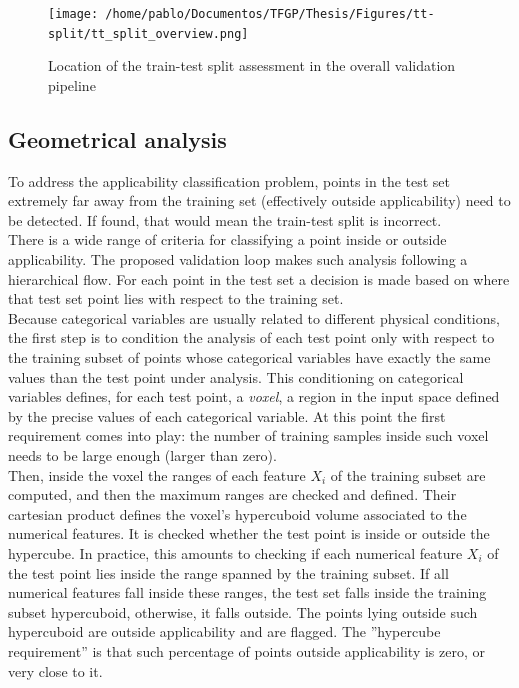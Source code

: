 \begin{figure}[!b]
	\centering
	\texttt{[image: /home/pablo/Documentos/TFGP/Thesis/Figures/tt-split/tt\_split\_overview.png]}
	\caption{Location of the train-test split assessment in the overall validation pipeline}
	\label{fig:esquemattsplit}
\end{figure}
%
\subsection{Geometrical analysis}
\indent To address the applicability classification problem, points in the test set extremely far away from the training set (effectively outside applicability) need to be detected. If found, that would mean the train-test split is incorrect.\\
%
\indent There is a wide range of criteria for classifying a point inside or outside applicability. The proposed validation loop makes such analysis following a hierarchical flow. For each point in the test set a decision is made based on where that test set point lies with respect to the training set.\\
%
\indent Because categorical variables are usually related to different physical conditions, the first step is to condition the analysis of each test point only with respect to the training subset of points whose categorical variables have exactly the same values than the test point under analysis. This conditioning on categorical variables defines, for each test point, a \textit{voxel}, \ie a region in the input space defined by the precise values of each categorical variable. At this point the first requirement comes into play: the number of training samples inside such voxel needs to be large enough (\eg larger than zero).\\
%
\indent Then, inside the voxel the ranges of each feature $X_i$ of the training subset are computed, and then the maximum ranges are checked and defined. Their cartesian product defines the voxel's hypercuboid volume associated to the numerical features. It is checked whether the test point is inside or outside the hypercube. In practice, this amounts to checking if each numerical feature $X_i$ of the test point lies inside the range spanned by the training subset. If all numerical features fall inside these ranges, the test set falls inside the training subset hypercuboid, otherwise, it falls outside. The points lying outside such hypercuboid are outside applicability and are flagged. The ''hypercube requirement'' is that such percentage of points outside applicability is zero, or very close to it.\\
